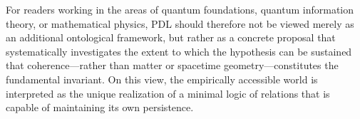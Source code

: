 \documentclass[11pt,a4paper]{article}
\begin{document}
For readers working in the areas of quantum foundations, quantum information theory, or mathematical physics, PDL should therefore not be viewed merely as an additional ontological framework, but rather as a concrete proposal that systematically investigates the extent to which the hypothesis can be sustained that coherence—rather than matter or spacetime geometry—constitutes the fundamental invariant. On this view, the empirically accessible world is interpreted as the unique realization of a minimal logic of relations that is capable of maintaining its own persistence.
\end{document}
